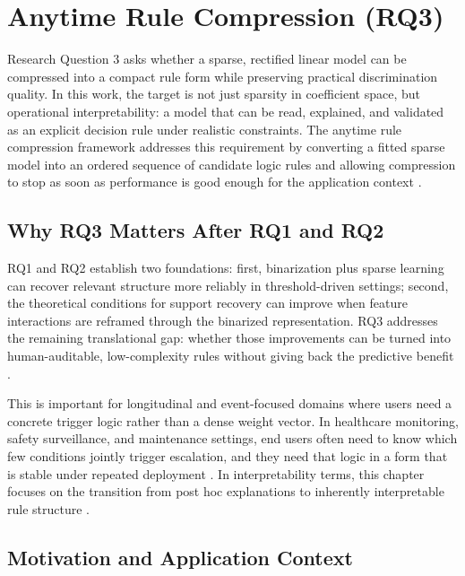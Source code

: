 
\chapter{Anytime Rule Compression (RQ3)}

Research Question 3 asks whether a sparse, rectified linear model can be compressed into a compact rule form while preserving practical discrimination quality. In this work, the target is not just sparsity in coefficient space, but operational interpretability: a model that can be read, explained, and validated as an explicit decision rule under realistic constraints. The anytime rule compression framework addresses this requirement by converting a fitted sparse model into an ordered sequence of candidate logic rules and allowing compression to stop as soon as performance is good enough for the application context \autocite{JOrender2025Anytime,JOrender2025Efficient}.

\section{Why RQ3 Matters After RQ1 and RQ2}

RQ1 and RQ2 establish two foundations: first, binarization plus sparse learning can recover relevant structure more reliably in threshold-driven settings; second, the theoretical conditions for support recovery can improve when feature interactions are reframed through the binarized representation. RQ3 addresses the remaining translational gap: whether those improvements can be turned into human-auditable, low-complexity rules without giving back the predictive benefit \autocite{JOrender2025Efficient,JOrender2025Anytime}.

This is important for longitudinal and event-focused domains where users need a concrete trigger logic rather than a dense weight vector. In healthcare monitoring, safety surveillance, and maintenance settings, end users often need to know which few conditions jointly trigger escalation, and they need that logic in a form that is stable under repeated deployment \autocite{wong2010longitudinal,hiploylee2017,shin2020}. In interpretability terms, this chapter focuses on the transition from post hoc explanations to inherently interpretable rule structure \autocite{CRudin2019Stop,WJMurdoch2019Definitions}.

\section{Motivation and Application Context}


